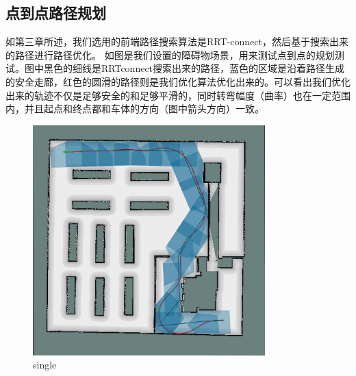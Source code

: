 \documentclass[master,academic]{ysuthesis} %
\begin{document}
		\subsection{点到点路径规划}
		如第三章所述，我们选用的前端路径搜索算法是RRT-connect，然后基于搜索出来的路径进行路径优化。
		如图\cite{fig:single}是我们设置的障碍物场景，用来测试点到点的规划测试。图中黑色的细线是RRTconnect搜索出来的路径，蓝色的区域是沿着路径生成的安全走廊，红色的圆滑的路径则是我们优化算法优化出来的。可以看出我们优化出来的轨迹不仅是足够安全的和足够平滑的，同时转弯幅度（曲率）也在一定范围内，并且起点和终点都和车体的方向（图中箭头方向）一致。
		\begin{figure}[!ht]
			\centering
			\includegraphics[width=0.8\textwidth]{single.png}
			\caption{single}
			\label{fig:single}
		\end{figure}
\end{document}
